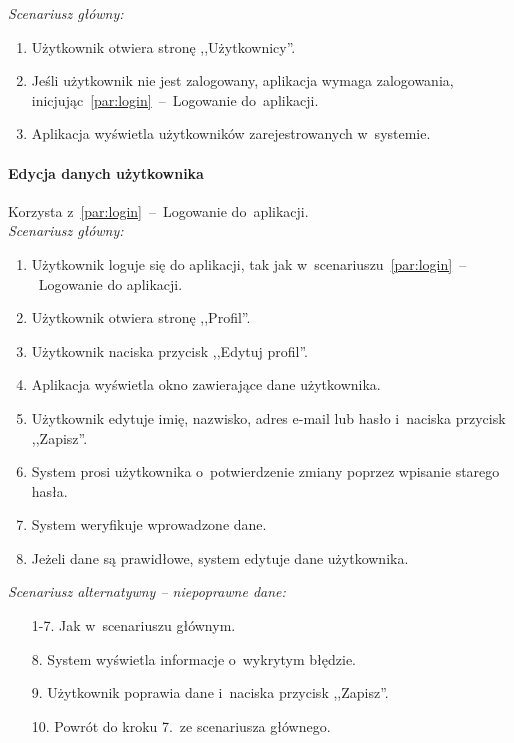 \noindent \textit{Scenariusz główny:}
\begin{enumerate}
  \item Użytkownik otwiera stronę ,,Użytkownicy''.
  \item Jeśli użytkownik nie jest zalogowany, aplikacja wymaga zalogowania, inicjując~\ref{par:login}~--~Logowanie do~aplikacji.
  \item Aplikacja wyświetla użytkowników zarejestrowanych w~systemie.
\end{enumerate}

\paragraph{Edycja danych użytkownika\newline}
\label{par:editUser}
Korzysta z~\ref{par:login}~--~Logowanie do~aplikacji.\\

\noindent \textit{Scenariusz główny:}
\begin{enumerate}
  \item Użytkownik loguje się do aplikacji, tak jak w~scenariuszu~\ref{par:login}~--~Logowanie do aplikacji.
  \item Użytkownik otwiera stronę ,,Profil''.
  \item Użytkownik naciska przycisk ,,Edytuj profil''.
  \item Aplikacja wyświetla okno zawierające dane użytkownika.
  \item Użytkownik edytuje imię, nazwisko, adres e-mail lub hasło i~naciska przycisk ,,Zapisz''.
  \item System prosi użytkownika o~potwierdzenie zmiany poprzez wpisanie starego hasła.
  \item System weryfikuje wprowadzone dane.
  \item Jeżeli dane są prawidłowe, system edytuje dane użytkownika.
\end{enumerate}

\noindent \textit{Scenariusz alternatywny -- niepoprawne dane:}
\begin{enumerate}
  \item[1-7.] Jak w~scenariuszu głównym.
  \item[8.] System wyświetla informacje o~wykrytym błędzie.
  \item[9.] Użytkownik poprawia dane i~naciska przycisk ,,Zapisz''.
  \item[10.] Powrót do kroku 7.~ze scenariusza głównego.
\end{enumerate}

